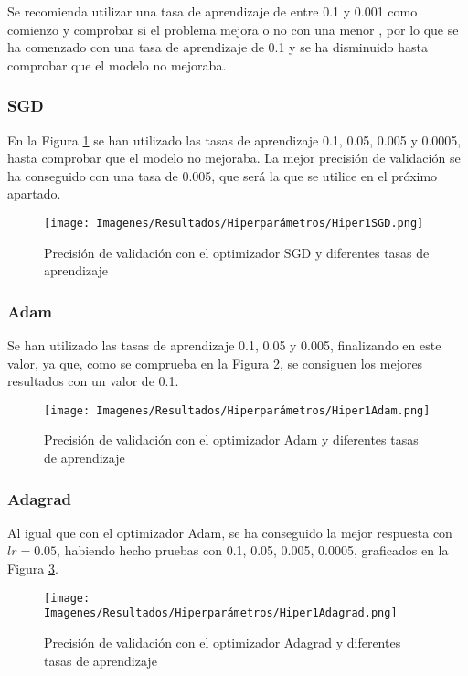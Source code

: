 \documentclass{report}
\begin{document}
Se recomienda utilizar una tasa de aprendizaje de entre 0.1 y 0.001 como comienzo y comprobar si el problema mejora o no con una menor \cite{LearningRate}, por lo que se ha comenzado con una tasa de aprendizaje de 0.1 y se ha disminuido hasta comprobar que el modelo no mejoraba.


\subsubsection{SGD}

En la Figura \ref{fig:Hiperparametros1SGD} se han utilizado las tasas de aprendizaje 0.1, 0.05, 0.005 y 0.0005, hasta comprobar que el modelo no mejoraba. La mejor precisión de validación se ha conseguido con una tasa de 0.005, que será la que se utilice en el próximo apartado.

\begin{figure}[H]
    \centering
    \texttt{[image: Imagenes/Resultados/Hiperparámetros/Hiper1SGD.png]}
    \caption{ Precisión de validación con el optimizador SGD y diferentes tasas de aprendizaje }
    \label{fig:Hiperparametros1SGD}
\end{figure}


\subsubsection{Adam}

Se han utilizado las tasas de aprendizaje 0.1, 0.05 y 0.005, finalizando en este valor, ya que, como se comprueba en la Figura \ref{fig:Hiperparametros1Adam}, se consiguen los mejores resultados con un valor de 0.1.

\begin{figure}[H]
    \centering
    \texttt{[image: Imagenes/Resultados/Hiperparámetros/Hiper1Adam.png]}
    \caption{ Precisión de validación con el optimizador Adam y diferentes tasas de aprendizaje }
    \label{fig:Hiperparametros1Adam}
\end{figure}

\subsubsection{Adagrad}

Al igual que con el optimizador Adam, se ha conseguido la mejor respuesta con $lr=0.05$, habiendo hecho pruebas con 0.1, 0.05, 0.005, 0.0005, graficados en la Figura \ref{fig:Hiperparametros1Adagrad}.

\begin{figure}[H]
    \centering
    \texttt{[image: Imagenes/Resultados/Hiperparámetros/Hiper1Adagrad.png]}
    \caption{ Precisión de validación con el optimizador Adagrad y diferentes tasas de aprendizaje }
    \label{fig:Hiperparametros1Adagrad}
\end{figure}
\end{document}
